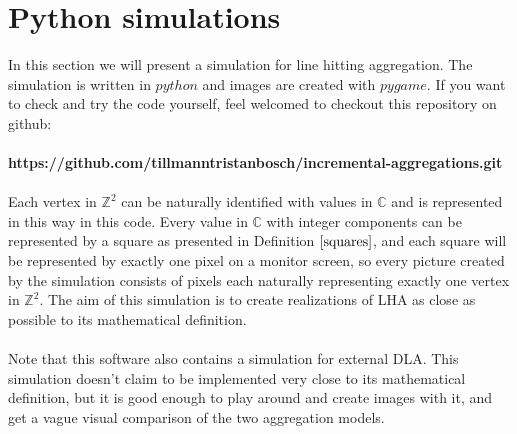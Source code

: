 \documentclass[12pt,a4paper]{scrartcl}
\newcommand{\C}{\mathbb{C}} %
\newcommand{\Z}{\mathbb{Z}} %
\newcommand{\1}{\mathbbm{1}}
\theoremstyle{definition}
\numberwithin{equation}{section}
\begin{document}
\section{Python simulations} \label{simulation}
In this section we will present a simulation for line hitting aggregation. The simulation is written in $\mathit{python}$ and images are created with $\mathit{pygame}$. If you want to check and try the code yourself, feel welcomed to checkout this repository on github:\\
\\\textbf{https://github.com/tillmanntristanbosch/incremental-aggregations.git} \\
\\Each vertex in $\Z^2$ can be naturally identified with values in $\C$ and is represented in this way in this code. Every value in $\C$ with integer components can be represented by a square as presented in Definition $\ref{squares}$, and each square will be represented by exactly one pixel on a monitor screen, so every picture created by the simulation consists of pixels each naturally representing exactly one vertex in $\Z^2$. The aim of this simulation is to create realizations of LHA as close as possible to its mathematical definition. \\
\\Note that this software also contains a simulation for external DLA. This simulation doesn't claim to be implemented very close to its mathematical definition, but it is good enough to play around and create images with it, and get a vague visual comparison of the two aggregation models. 
\end{document}
